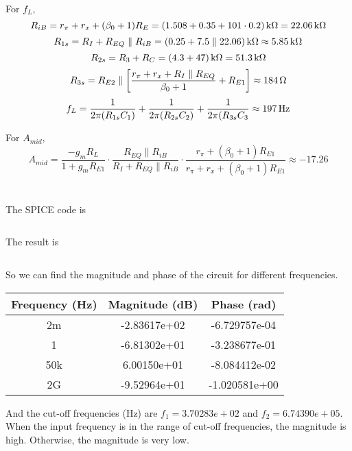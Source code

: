 \documentclass{article}
\newcommand{\unit}[1]{{\rm\,#1}}
\begin{document}
For $f_L$,
$$R_{iB}=r_\pi+r_x+(\beta_0+1)R_E=(1.508+0.35+101\cdot0.2)\unit{k\Omega}=22.06\unit{k\Omega}$$
$$R_{1s}=R_I+R_{EQ}\parallel R_{iB}=(0.25+7.5\parallel22.06)\unit{k\Omega}\approx5.85\unit{k\Omega}$$
$$R_{2s}=R_3+R_C=(4.3+47)\unit{k\Omega}=51.3\unit{k\Omega}$$
$$R_{3s}=R_{E2}\parallel\left[\frac{r_\pi+r_x+R_I\parallel R_{EQ}}{\beta_0+1}+R_{E1}\right]\approx184\unit{\Omega}$$
$$f_L=\frac{1}{2\pi(R_{1s}C_1)}+\frac{1}{2\pi(R_{2s}C_2)}+\frac{1}{2\pi(R_{3s}C_3}\approx197\unit{Hz}$$

For $A_{mid}$,
$$A_{mid}=\frac{-g_mR_L}{1+g_mR_{E1}}\cdot\frac{R_{EQ}\parallel R_{iB}}{R_I+R_{EQ}\parallel R_{iB}}\cdot\frac{r_\pi+(\beta_0+1)R_{E1}}{r_\pi+r_x+(\beta_0+1)R_{E1}}\approx-17.26$$


\section{}

The SPICE code is

\inputminted[linenos,xleftmargin
=1.5em]{v}{p4.cir}

The result is

\inputminted[linenos,firstline=18,lastline=33,firstnumber=1,xleftmargin
=1.5em]{v}{p4.result}

So we can find the magnitude and phase of the circuit for different frequencies.

\begin{center}
\begin{tabular}{|c|c|c|}
\hline Frequency (Hz) & Magnitude (dB) & Phase (rad) \\\hline
2m	& -2.83617e+02 & -6.729757e-04 \\\hline
1	& -6.81302e+01 & -3.238677e-01 \\\hline
50k	&  6.00150e+01 & -8.084412e-02 \\\hline
2G	& -9.52964e+01 & -1.020581e+00 \\\hline
\end{tabular}
\end{center}

And the cut-off frequencies (Hz) are $f_1=3.70283e+02$ and $f_2=6.74390e+05$. When the input frequency is in the range of cut-off frequencies, the magnitude is high. Otherwise, the magnitude is very low.
\end{document}
